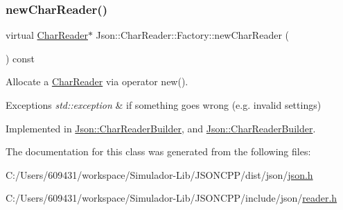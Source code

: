 \subsubsection{\texorpdfstring{new\+Char\+Reader()}{newCharReader()}\hspace{0.1cm}{\footnotesize\ttfamily [2/2]}}
{\footnotesize\ttfamily virtual \hyperlink{class_json_1_1_char_reader}{Char\+Reader}$\ast$ Json\+::\+Char\+Reader\+::\+Factory\+::new\+Char\+Reader (\begin{DoxyParamCaption}{ }\end{DoxyParamCaption}) const\hspace{0.3cm}{\ttfamily [pure virtual]}}



Allocate a \hyperlink{class_json_1_1_char_reader}{Char\+Reader} via operator new(). 


\begin{DoxyExceptions}{Exceptions}
{\em std\+::exception} & if something goes wrong (e.\+g. invalid settings) \\
\hline
\end{DoxyExceptions}


Implemented in \hyperlink{class_json_1_1_char_reader_builder_a3a262fcc76c1eb8eebfd4718fb4e9722}{Json\+::\+Char\+Reader\+Builder}, and \hyperlink{class_json_1_1_char_reader_builder_ab14c54e438007a57c1acbd6e7459d4d0}{Json\+::\+Char\+Reader\+Builder}.



The documentation for this class was generated from the following files\+:\begin{DoxyCompactItemize}
\item 
C\+:/\+Users/609431/workspace/\+Simulador-\/\+Lib/\+J\+S\+O\+N\+C\+P\+P/dist/json/\hyperlink{dist_2json_2json_8h}{json.\+h}\item 
C\+:/\+Users/609431/workspace/\+Simulador-\/\+Lib/\+J\+S\+O\+N\+C\+P\+P/include/json/\hyperlink{reader_8h}{reader.\+h}\end{DoxyCompactItemize}
